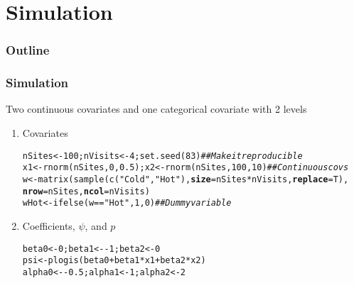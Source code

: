 \documentclass[color=usenames,dvipsnames]{beamer}\usepackage[]{graphicx}\usepackage[]{xcolor}
\makeatletter
\newcommand{\hlnum}[1]{\textcolor[rgb]{0.69,0.494,0}{#1}}%
\newcommand{\hlstr}[1]{\textcolor[rgb]{0.749,0.012,0.012}{#1}}%
\newcommand{\hlcom}[1]{\textcolor[rgb]{0.514,0.506,0.514}{\textit{#1}}}%
\newcommand{\hlopt}[1]{\textcolor[rgb]{0,0,0}{#1}}%
\newcommand{\hlstd}[1]{\textcolor[rgb]{0,0,0}{#1}}%
\newcommand{\hlkwb}[1]{\textcolor[rgb]{0,0.341,0.682}{#1}}%
\newcommand{\hlkwc}[1]{\textcolor[rgb]{0,0,0}{\textbf{#1}}}%
\newcommand{\hlkwd}[1]{\textcolor[rgb]{0.004,0.004,0.506}{#1}}%
\newenvironment{kframe}{%
 \def\at@end@of@kframe{}%
 \ifinner\ifhmode%
  \def\at@end@of@kframe{\end{minipage}}%
  \begin{minipage}{\columnwidth}%
 \fi\fi%
 \def\FrameCommand##1{\hskip\@totalleftmargin \hskip-\fboxsep
 \colorbox{shadecolor}{##1}\hskip-\fboxsep
     \hskip-\linewidth \hskip-\@totalleftmargin \hskip\columnwidth}%
 \MakeFramed {\advance\hsize-\width
   \@totalleftmargin\z@ \linewidth\hsize
   \@setminipage}}%
 {\par\unskip\endMakeFramed%
 \at@end@of@kframe}
\newenvironment{knitrout}{}{} %
\makeatother
\begin{document}
\section{Simulation}



\begin{frame}
  \frametitle{Outline}
  \Large
  \tableofcontents[currentsection]
\end{frame}


\begin{frame}[fragile]
  \frametitle{Simulation}
  \small
  Two continuous covariates and one categorical covariate with 2 levels
  \vfill
  \begin{enumerate}[<+->]
  \item Covariates
\begin{knitrout}\scriptsize
{}\color{fgcolor}\begin{kframe}
\begin{alltt}
\hlstd{nSites} \hlkwb{<-} \hlnum{100}\hlstd{; nVisits} \hlkwb{<-} \hlnum{4}\hlstd{;} \hlkwd{set.seed}\hlstd{(}\hlnum{83}\hlstd{)} \hlcom{## Make it reproducible}
\hlstd{x1} \hlkwb{<-} \hlkwd{rnorm}\hlstd{(nSites,}\hlnum{0}\hlstd{,}\hlnum{0.5}\hlstd{); x2} \hlkwb{<-} \hlkwd{rnorm}\hlstd{(nSites,}\hlnum{100}\hlstd{,}\hlnum{10}\hlstd{)} \hlcom{## Continuous covs}
\hlstd{w} \hlkwb{<-} \hlkwd{matrix}\hlstd{(}\hlkwd{sample}\hlstd{(}\hlkwd{c}\hlstd{(}\hlstr{"Cold"}\hlstd{,} \hlstr{"Hot"}\hlstd{),} \hlkwc{size}\hlstd{=nSites}\hlopt{*}\hlstd{nVisits,} \hlkwc{replace}\hlstd{=T),}
            \hlkwc{nrow}\hlstd{=nSites,} \hlkwc{ncol}\hlstd{=nVisits)}
\hlstd{wHot} \hlkwb{<-} \hlkwd{ifelse}\hlstd{(w}\hlopt{==}\hlstr{"Hot"}\hlstd{,} \hlnum{1}\hlstd{,} \hlnum{0}\hlstd{)}              \hlcom{## Dummy variable}
\end{alltt}
\end{kframe}
\end{knitrout}
  \item Coefficients, $\psi$, and $p$
\begin{knitrout}\scriptsize
{}\color{fgcolor}\begin{kframe}
\begin{alltt}
\hlstd{beta0} \hlkwb{<-} \hlnum{0}\hlstd{; beta1} \hlkwb{<-} \hlopt{-}\hlnum{1}\hlstd{; beta2} \hlkwb{<-} \hlnum{0}
\hlstd{psi} \hlkwb{<-} \hlkwd{plogis}\hlstd{(beta0} \hlopt{+} \hlstd{beta1}\hlopt{*}\hlstd{x1} \hlopt{+} \hlstd{beta2}\hlopt{*}\hlstd{x2)}
\hlstd{alpha0} \hlkwb{<-} \hlopt{-}\hlnum{0.5}\hlstd{; alpha1} \hlkwb{<-} \hlnum{1}\hlstd{; alpha2} \hlkwb{<-} \hlnum{2}

\end{alltt}
\end{kframe}
\end{knitrout}
\end{enumerate}
\end{frame}
\end{document}

